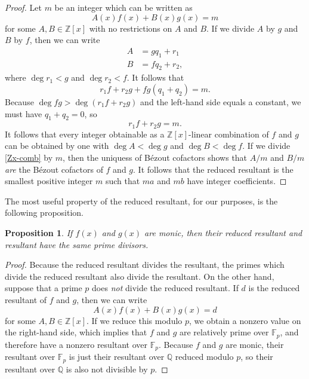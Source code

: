 \documentclass[]{article}
\newtheorem{proposition}{Proposition}[section]
\theoremstyle{definition}
\begin{document}
\begin{proof}
    Let $m$ be an integer which can be written as
    \begin{equation}
        \label{Zx-comb}
        A(x) f(x) + B(x) g(x) = m
    \end{equation}
    for some $A, B \in \mathbb{Z}[x]$ with no restrictions on $A$ and $B$. If
    we divide $A$ by $g$ and $B$ by $f$, then we can write
    \begin{align*}
        A &= g q_1 + r_1 \\
        B &= f q_2 + r_2,
    \end{align*}
    where $\deg r_1 < g$ and $\deg r_2 < f$. It follows that
    \begin{equation*}
        r_1 f + r_2 g + fg (q_1 + q_2) = m.
    \end{equation*}
    Because $\deg fg > \deg(r_1 f + r_2 g)$ and the left-hand side equals a
    constant, we must have $q_1 + q_2 = 0$, so
    \begin{equation*}
        r_1 f + r_2 g = m.
    \end{equation*}
    It follows that every integer obtainable as a $\mathbb{Z}[x]$-linear
    combination of $f$ and $g$ can be obtained by one with $\deg A < \deg g$
    and $\deg B < \deg f$. If we divide \eqref{Zx-comb} by $m$, then the
    uniquess of B\'ezout cofactors shows that $A / m$ and $B / m$ \emph{are}
    the B\'ezout cofactors of $f$ and $g$. It follows that the reduced
    resultant is the smallest positive integer $m$ such that $ma$ and $mb$ have
    integer coefficients.
\end{proof}

The most useful property of the reduced resultant, for our purposes, is the
following proposition.

\begin{proposition}
    \label{same-primes}
    If $f(x)$ and $g(x)$ are monic, then their reduced resultant and resultant
    have the same prime divisors.
\end{proposition}

\begin{proof}
    Because the reduced resultant divides the resultant, the primes which divide
    the reduced resultant also divide the resultant. On the other hand, suppose
    that a prime $p$ does \emph{not} divide the reduced resultant. If $d$ is the
    reduced resultant of $f$ and $g$, then we can write
    \begin{equation*}
        A(x) f(x) + B(x) g(x) = d
    \end{equation*}
    for some $A, B \in \mathbb{Z}[x]$. If we reduce this modulo $p$, we obtain
    a nonzero value on the right-hand side, which implies that $f$ and $g$ are
    relatively prime over $\mathbb{F}_p$, and therefore have a nonzero
    resultant over $\mathbb{F}_p$. Because $f$ and $g$ are monic, their
    resultant over $\mathbb{F}_p$ is just their resultant over $\mathbb{Q}$
    reduced modulo $p$, so their resultant over $\mathbb{Q}$ is also not
    divisible by $p$.
\end{proof}
\end{document}
